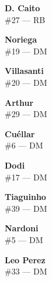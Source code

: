 \documentclass[11pt]{article}
\begin{document}
\begin{minipage}[t]{0.30\textwidth}
\centering
\textbf{D. Caito}\\
\#27 --- RB\\
\vspace{0.2cm}
\end{minipage}
\hfill
\begin{minipage}[t]{0.30\textwidth}
\centering
\textbf{Noriega}\\
\#19 --- DM\\
\vspace{0.2cm}
\end{minipage}
\hfill
\begin{minipage}[t]{0.30\textwidth}
\centering
\textbf{Villasanti}\\
\#20 --- DM\\
\vspace{0.2cm}
\end{minipage}
\vspace{0.5cm}

\begin{minipage}[t]{0.30\textwidth}
\centering
\textbf{Arthur}\\
\#29 --- DM\\
\vspace{0.2cm}
\end{minipage}
\hfill
\begin{minipage}[t]{0.30\textwidth}
\centering
\textbf{Cuéllar}\\
\#6 --- DM\\
\vspace{0.2cm}
\end{minipage}
\hfill
\begin{minipage}[t]{0.30\textwidth}
\centering
\textbf{Dodi}\\
\#17 --- DM\\
\vspace{0.2cm}
\end{minipage}
\vspace{0.5cm}

\begin{minipage}[t]{0.30\textwidth}
\centering
\textbf{Tiaguinho}\\
\#39 --- DM\\
\vspace{0.2cm}
\end{minipage}
\hfill
\begin{minipage}[t]{0.30\textwidth}
\centering
\textbf{Nardoni}\\
\#5 --- DM\\
\vspace{0.2cm}
\end{minipage}
\hfill
\begin{minipage}[t]{0.30\textwidth}
\centering
\textbf{Leo Perez}\\
\#33 --- DM\\
\vspace{0.2cm}
\end{minipage}
\vspace{0.5cm}
\end{document}
